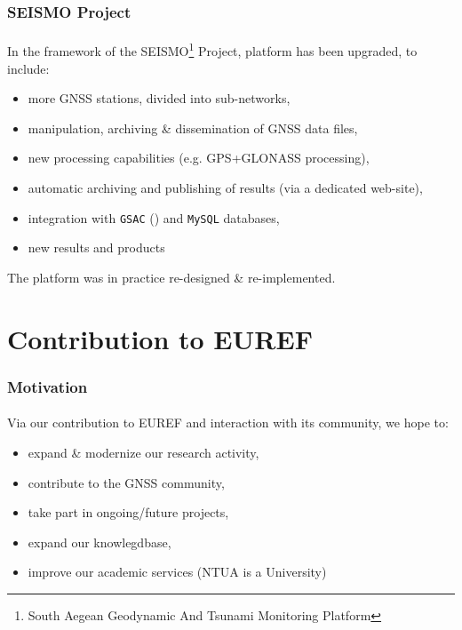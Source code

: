 \documentclass{beamer}
\begin{document}
\begin{frame}\frametitle{SEISMO Project}\framesubtitle{}
  In the framework of the SEISMO\footnote{South Aegean Geodynamic And Tsunami Monitoring Platform} Project, platform has been upgraded,
  to include:

  \begin{itemize}
    \item more GNSS stations, divided into sub-networks,
    \item manipulation, archiving \& dissemination of GNSS data files,
    \item new processing capabilities (e.g. GPS+GLONASS processing),
    \item automatic archiving and publishing of results (via a dedicated web-site),
    \item integration with \texttt{GSAC} (\cite{gsac}) and \texttt{MySQL} databases,
    \item new results and products
  \end{itemize}

  The platform was in practice re-designed \& re-implemented.

\end{frame}


\section{Contribution to EUREF}

\begin{frame}\frametitle{Motivation}\framesubtitle{}
  Via our contribution to EUREF and interaction with its community, we hope to:
  \begin{itemize}
    \item expand \& modernize our research activity,
    \item contribute to the GNSS community,
    \item take part in ongoing/future projects,
    \item expand our knowlegdbase,
    \item improve our academic services (NTUA is a University)
  \end{itemize}
\end{frame}
\end{document}
